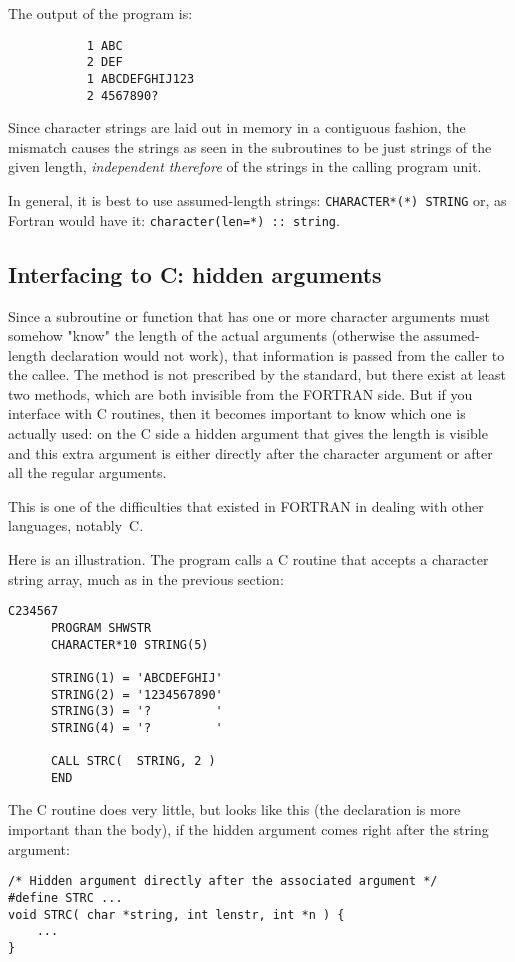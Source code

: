 The output of the program is:
\begin{verbatim}
           1 ABC
           2 DEF
           1 ABCDEFGHIJ123
           2 4567890?
\end{verbatim}

Since character strings are laid out in memory in a contiguous fashion, the mismatch causes the
strings as seen in the subroutines to be just strings of the given length, \emph{independent therefore}
of the strings in the calling program unit.

In general, it is best to use assumed-length strings: \verb+CHARACTER*(*) STRING+ or, as Fortran
would have it: \verb+character(len=*) :: string+.

\subsection{Interfacing to C: hidden arguments}
Since a subroutine or function that has one or more character arguments must somehow "know" the
length of the actual arguments (otherwise the assumed-length declaration would not work),
that information is passed from the caller to the callee. The method is not prescribed by the
standard, but there exist at least two methods, which are both invisible from the FORTRAN side.
But if you interface with C routines, then it becomes important to know which one is actually
used: on the C side a hidden argument that gives the length is visible and this extra argument
is either directly after the character argument or after all the regular arguments.

This is one of the difficulties that existed in FORTRAN in dealing with other languages, notably~C.

Here is an illustration. The program calls a C routine that accepts a character string array,
much as in the previous section:
\begin{verbatim}
C234567
      PROGRAM SHWSTR
      CHARACTER*10 STRING(5)

      STRING(1) = 'ABCDEFGHIJ'
      STRING(2) = '1234567890'
      STRING(3) = '?         '
      STRING(4) = '?         '

      CALL STRC(  STRING, 2 )
      END
\end{verbatim}

The C routine does very little, but looks like this (the declaration is more important than
the body), if the hidden argument comes right after the string argument:
\begin{verbatim}
/* Hidden argument directly after the associated argument */
#define STRC ...
void STRC( char *string, int lenstr, int *n ) {
    ...
}
\end{verbatim}


